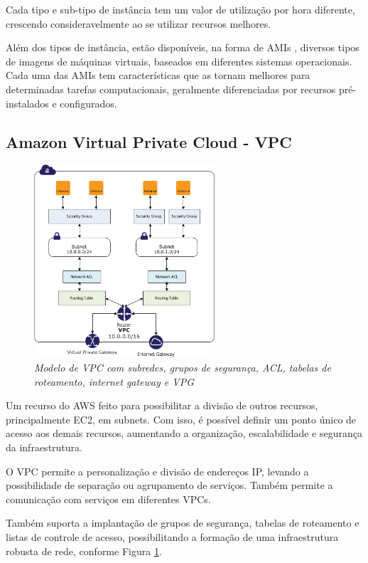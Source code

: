 \documentclass[tg]{mdtufsm}
\begin{document}
Cada tipo e sub-tipo de instância tem um valor de utilização por hora diferente, crescendo consideravelmente ao se utilizar recursos melhores.

Além dos tipos de instância, estão disponíveis, na forma de AMIs \cite{ami}, diversos tipos de imagens de máquinas virtuais, baseados em diferentes sistemas operacionais. Cada uma das AMIs tem características que as tornam melhores para determinadas tarefas computacionais, geralmente diferenciadas por recursos pré-instalados e configurados.

\subsection{Amazon Virtual Private Cloud - VPC}

\begin{figure}
	\centering
	\includegraphics[width=0.6\textwidth]{vpc}
	\caption{\emph{Modelo de VPC com subredes, grupos de segurança, ACL, tabelas de roteamento, internet gateway e VPG \cite{vpcimg}}}
	\label{fig:vpcImg}
\end{figure}

Um recurso do AWS feito para possibilitar a divisão de outros recursos, principalmente EC2, em subnets. Com isso, é possível definir um ponto único de acesso aos demais recursos, aumentando a organização, escalabilidade e segurança da infraestrutura.

O VPC permite a personalização e divisão de endereços IP, levando a possibilidade de separação ou agrupamento de serviços. Também permite a comunicação com serviços em diferentes VPCs.

Também suporta a implantação de grupos de segurança, tabelas de roteamento e listas de controle de acesso, possibilitando a formação de uma infraestrutura robusta de rede, conforme Figura \ref{fig:vpcImg}.
\end{document}
